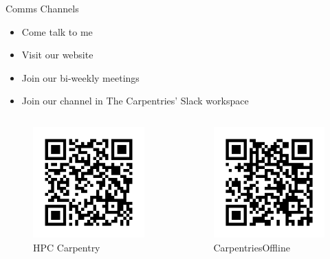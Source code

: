 \begin{frame}{Comms Channels}
\begin{itemize}
	\item Come talk to me
	\item Visit our website
	\item Join our bi-weekly meetings
	\item Join our channel in The Carpentries' Slack workspace
\end{itemize}

\begin{columns}
	\begin{column}[c]{.5\linewidth}
		\begin{figure}
			\includegraphics[width=.5\columnwidth]{images/hpc-carpentry.png} 
			\caption*{HPC Carpentry}
		\end{figure}
	\end{column}
	\begin{column}[c]{.5\linewidth}
		\begin{figure}
			\includegraphics[width=.5\columnwidth]{images/carpentriesoffline.png}
			\caption*{CarpentriesOffline}
		\end{figure}
	\end{column}
\end{columns}

\end{frame}